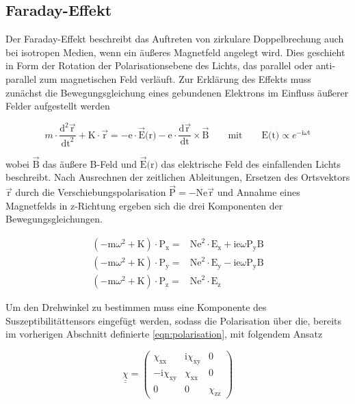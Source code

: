     \subsection{Faraday-Effekt}
        Der Faraday-Effekt beschreibt das Auftreten von zirkulare Doppelbrechung auch bei isotropen Medien, wenn ein äußeres Magnetfeld angelegt wird. Dies geschieht in Form der Rotation der Polarisationsebene
        des Lichts, das parallel oder anti-parallel zum magnetischen Feld verläuft. Zur Erklärung des Effekts muss zunächst die Bewegungsgleichung eines gebundenen Elektrons im  Einfluss äußerer Felder
        aufgestellt werden

        \begin{equation*}
            m \cdot \frac{\text{d}^2\vec{\text{r}}}{\text{dt}^2} + \text{K} \cdot \vec{\text{r}} = -\text{e} \cdot \vec{\text{E}}\text{(r)} - \text{e} \cdot \frac{\text{d}\vec{\text{r}}}{\text{dt}} \times \vec{\text{B}} \qquad \text{mit} \qquad \text{E(t)} \propto e^{-\text{i} \omega \text{t}}
        \end{equation*}

        wobei $\vec{\text{B}}$ das äußere B-Feld und $\vec{\text{E}}\text{(r)}$ das elektrische Feld des einfallenden Lichts beschreibt. Nach Ausrechnen der zeitlichen Ableitungen, Ersetzen des Ortsvektors
        $\vec{\text{r}}$ durch die Verschiebungspolarisation $\vec{\text{P}} = - \text{Ne} \vec{\text{r}}$ und Annahme eines Magnetfelds in z-Richtung ergeben sich die drei Komponenten der Bewegungsgleichungen.

        \begin{align*}
            \left(-\text{m}\omega^2 + \text{K}\right) \cdot \text{P}_{\text{x}} =& \text{Ne}^2 \cdot \text{E}_{\text{x}} + \text{ie} \omega \text{P}_{\text{y}} \text{B} \\
            \left(-\text{m}\omega^2 + \text{K}\right) \cdot \text{P}_{\text{y}} =& \text{Ne}^2 \cdot \text{E}_{\text{y}} - \text{ie} \omega \text{P}_{\text{y}} \text{B} \\
            \left(-\text{m}\omega^2 + \text{K}\right) \cdot \text{P}_{\text{z}} =& \text{Ne}^2 \cdot \text{E}_{\text{z}}
        \end{align*}

        Um den Drehwinkel zu bestimmen muss eine Komponente des Suszeptibilitättensors eingefügt werden, sodass die Polarisation über die, bereits im vorherigen Abschnitt definierte \ref{eqn:polarisation}, mit
        folgendem Ansatz 

        \begin{equation*}
            \underline{\underline{\chi}} =
            \begin{pmatrix}
                \chi_{\text{xx}} & \text{i} \chi_{\text{xy}} & 0 \\
                -\text{i}\chi_{\text{xy}} & \chi_{\text{xx}} & 0 \\
                0 & 0 & \chi_{\text{zz}}
            \end{pmatrix}
            \label{eqn:suszeptibilität}
        \end{equation*}

